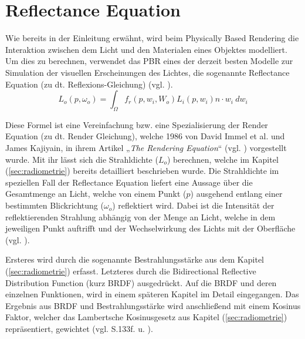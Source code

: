 \documentclass[
  11pt,
  a4paper,
  oneside
  ]{article}
\begin{document}
\section{Reflectance Equation}\label{sec:reflac}
Wie bereits in der Einleitung erwähnt, wird beim Physically Based Rendering die Interaktion zwischen dem Licht und den Materialen eines Objektes modelliert. Um dies zu berechnen, verwendet das PBR eines der derzeit besten Modelle zur Simulation der visuellen Erscheinungen des Lichtes, die sogenannte Reflectance Equation (zu dt. Reflexions-Gleichung) 
(vgl. \cite{learnOpenGL}). 
\begin{equation}
  L_{o}\left( p,\omega _{o}\right) =\int _{\Omega }f_{r}\left( p,w_{i},W_{o}\right)L_{i}\left( p,w_{i}\right)n\cdot w_{i} \ dw_{i}
\end{equation}

Diese Formel ist eine Vereinfachung bzw. eine Spezialisierung der Render Equation (zu dt. Render Gleichung), welche 1986 von David Immel et al. und James Kajiyain, in ihrem Artikel „\textit{The Rendering Equation}“ (vgl. \cite{theRenderingEquation}) vorgestellt wurde. Mit ihr lässt sich die Strahldichte ($L_{o}$) berechnen, welche im Kapitel (\ref{sec:radiometrie}) bereits detailliert beschrieben wurde. Die Strahldichte im speziellen Fall der Reflectance Equation liefert eine Aussage über die Gesamtmenge an Licht, welche von einem Punkt ($p$) ausgehend entlang einer bestimmten Blickrichtung ($\omega_{o}$) reflektiert wird. Dabei ist die Intensität der reflektierenden Strahlung abhängig von der Menge an Licht, welche in dem jeweiligen Punkt auftrifft und der Wechselwirkung des Lichts mit der Oberfläche (vgl. \cite{learnOpenGL}). 

Ersteres wird durch die sogenannte Bestrahlungsstärke aus dem Kapitel (\ref{sec:radiometrie}) erfasst. Letzteres durch die Bidirectional Reflective Distribution Function (kurz BRDF) ausgedrückt. Auf die BRDF und deren einzelnen Funktionen, wird in einem späteren Kapitel im Detail eingegangen. Das Ergebnis aus BRDF und Bestrahlungsstärke wird anschließend mit einem Kosinus Faktor, welcher das Lambertsche Kosinusgesetz aus Kapitel (\ref{sec:radiometrie}) repräsentiert, gewichtet 
(vgl. S.133f. \cite{openGlWolf} u. \cite{learnOpenGL}).
\end{document}
